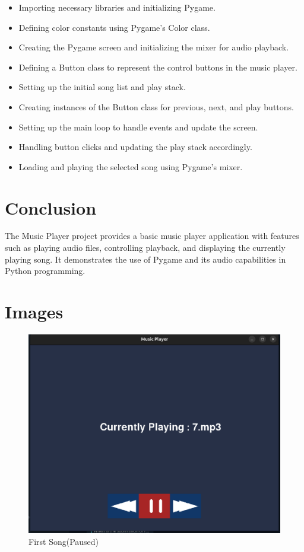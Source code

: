 \documentclass{article}
\begin{document}
\begin{itemize}
\item Importing necessary libraries and initializing Pygame.
\item Defining color constants using Pygame's Color class.
\item Creating the Pygame screen and initializing the mixer for audio playback.
\item Defining a Button class to represent the control buttons in the music player.
\item Setting up the initial song list and play stack.
\item Creating instances of the Button class for previous, next, and play buttons.
\item Setting up the main loop to handle events and update the screen.
\item Handling button clicks and updating the play stack accordingly.
\item Loading and playing the selected song using Pygame's mixer.
\end{itemize}

\section{Conclusion}
The Music Player project provides a basic music player application with features such as playing audio files, controlling playback, and displaying the currently playing song. It demonstrates the use of Pygame and its audio capabilities in Python programming.


\section{Images}
\begin{figure}[h!]
        \includegraphics[scale = 0.25]{figs/img1}
        \caption{First Song(Paused)}
        \label{fig:1}
\end{figure}
\end{document}
